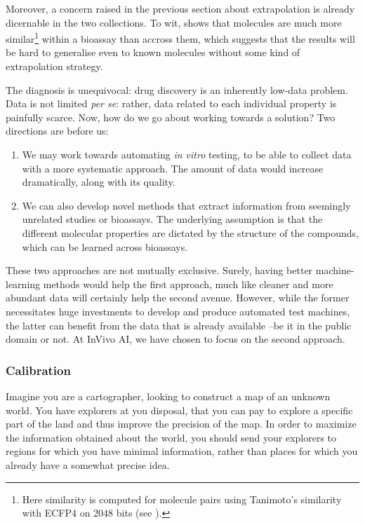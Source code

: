 \documentclass[11pt]{article}
\numberwithin{equation}{subsection}
\begin{document}

Moreover, a concern raised in the previous section about extrapolation is already dicernable in the two collections. To wit,  shows that molecules are much more similar\footnote{Here similarity is computed for molecule pairs using Tanimoto's similarity with ECFP4 on 2048 bits (see ).} within a bioassay than accross them, which suggests that the results will be hard to generalise even to known molecules without some kind of extrapolation strategy.

The diagnosis is unequivocal: drug discovery is an inherently low-data problem. Data is not limited \textit{per se}: rather, data related to each individual property is painfully scarce. Now, how do we go about working towards a solution? Two directions are before us:
\begin{enumerate}
  \item We may work towards automating \textit{in vitro} testing, to be able to collect data with a more systematic approach. The amount of data would increase dramatically, along with its quality.

  \item We can also develop novel methods that extract information from seemingly unrelated studies or bioassays. The underlying assumption is that the different molecular properties are dictated by the structure of the compounds, which can be learned across bioassays.
\end{enumerate}

These two approaches are not mutually exclusive. Surely, having better machine-learning methods would help the first approach, much like cleaner and more abundant data will certainly help the second avenue. However, while the former necessitates huge investments to develop and produce automated test machines, the latter can benefit from the data that is already available --be it in the public domain or not. At InVivo AI, we have chosen to focus on the second approach.


\subsubsection{Calibration}

Imagine you are a cartographer, looking to construct a map of an unknown world. You have explorers at you disposal, that you can pay to explore a specific part of the land and thus improve the precision of the map. In order to maximize the information obtained about the world, you should send your explorers to regions for which you have minimal information, rather than places for which you already have a somewhat precise idea.
\end{document}
